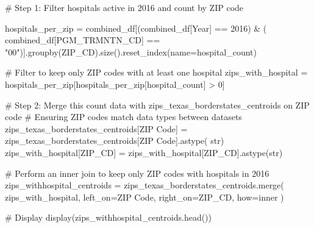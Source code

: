 \documentclass[
  letterpaper,
  DIV=11,
  numbers=noendperiod]{scrartcl}
\newenvironment{Shaded}{\begin{snugshade}}{\end{snugshade}}
\newcommand{\BuiltInTok}[1]{\textcolor[rgb]{0.00,0.23,0.31}{#1}}
\newcommand{\CommentTok}[1]{\textcolor[rgb]{0.37,0.37,0.37}{#1}}
\newcommand{\DecValTok}[1]{\textcolor[rgb]{0.68,0.00,0.00}{#1}}
\newcommand{\NormalTok}[1]{\textcolor[rgb]{0.00,0.23,0.31}{#1}}
\newcommand{\OperatorTok}[1]{\textcolor[rgb]{0.37,0.37,0.37}{#1}}
\newcommand{\StringTok}[1]{\textcolor[rgb]{0.13,0.47,0.30}{#1}}
\begin{document}
\begin{Shaded}
\begin{Highlighting}[]
\CommentTok{\# Step 1: Filter hospitals active in 2016 and count by ZIP code}

\NormalTok{hospitals\_per\_zip }\OperatorTok{=}\NormalTok{ combined\_df[(combined\_df[}\StringTok{\textquotesingle{}Year\textquotesingle{}}\NormalTok{] }\OperatorTok{==} \DecValTok{2016}\NormalTok{) }\OperatorTok{\&}\NormalTok{ (}
\NormalTok{    combined\_df[}\StringTok{\textquotesingle{}PGM\_TRMNTN\_CD\textquotesingle{}}\NormalTok{] }\OperatorTok{==} \StringTok{"00"}\NormalTok{)].groupby(}\StringTok{\textquotesingle{}ZIP\_CD\textquotesingle{}}\NormalTok{).size().reset\_index(name}\OperatorTok{=}\StringTok{\textquotesingle{}hospital\_count\textquotesingle{}}\NormalTok{)}


\CommentTok{\# Filter to keep only ZIP codes with at least one hospital}
\NormalTok{zips\_with\_hospital }\OperatorTok{=}\NormalTok{ hospitals\_per\_zip[hospitals\_per\_zip[}\StringTok{\textquotesingle{}hospital\_count\textquotesingle{}}\NormalTok{] }\OperatorTok{\textgreater{}} \DecValTok{0}\NormalTok{]}

\CommentTok{\# Step 2: Merge this count data with zips\_texas\_borderstates\_centroids on ZIP code}
\CommentTok{\# Ensuring ZIP codes match data types between datasets}
\NormalTok{zips\_texas\_borderstates\_centroids[}\StringTok{\textquotesingle{}ZIP Code\textquotesingle{}}\NormalTok{] }\OperatorTok{=}\NormalTok{ zips\_texas\_borderstates\_centroids[}\StringTok{\textquotesingle{}ZIP Code\textquotesingle{}}\NormalTok{].astype(}
    \BuiltInTok{str}\NormalTok{)}
\NormalTok{zips\_with\_hospital[}\StringTok{\textquotesingle{}ZIP\_CD\textquotesingle{}}\NormalTok{] }\OperatorTok{=}\NormalTok{ zips\_with\_hospital[}\StringTok{\textquotesingle{}ZIP\_CD\textquotesingle{}}\NormalTok{].astype(}\BuiltInTok{str}\NormalTok{)}

\CommentTok{\# Perform an inner join to keep only ZIP codes with hospitals in 2016}
\NormalTok{zips\_withhospital\_centroids }\OperatorTok{=}\NormalTok{ zips\_texas\_borderstates\_centroids.merge(}
\NormalTok{    zips\_with\_hospital, left\_on}\OperatorTok{=}\StringTok{\textquotesingle{}ZIP Code\textquotesingle{}}\NormalTok{, right\_on}\OperatorTok{=}\StringTok{\textquotesingle{}ZIP\_CD\textquotesingle{}}\NormalTok{, how}\OperatorTok{=}\StringTok{\textquotesingle{}inner\textquotesingle{}}
\NormalTok{)}

\CommentTok{\# Display}
\NormalTok{display(zips\_withhospital\_centroids.head())}
\end{Highlighting}
\end{Shaded}
\end{document}
